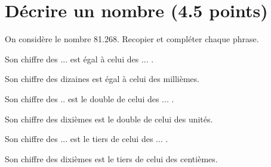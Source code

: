\section{Décrire un nombre (4.5 points)}

On considère le nombre \num{81.268}.
Recopier et compléter chaque phrase.
\begin{questions}
	
	
	\question[1\half] Son chiffre des ... est égal à celui des ... .
	\begin{solution}
		Son chiffre des dizaines est égal à celui des millièmes.
	\end{solution}
	
	
	\question[1\half] Son chiffre des .. est le double de celui des ... .
	\begin{solution}
		Son chiffre des dixièmes est le double de celui des unités.
	\end{solution}
	
	\question[1\half] Son chiffre des ... est le tiers de celui des ... .
	\begin{solution}
		Son chiffre des dixièmes est le tiers de celui des centièmes.
	\end{solution}
	
\end{questions}

